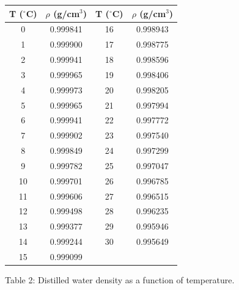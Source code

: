 \documentclass{article}
\begin{document}
\vspace{0.5cm}
\begin{center}
\begin{tabular}{|c|c||c|c|} \hline
T ($^{\circ}$C)  &  $\rho$ (g/cm$^{3}$) & T ($^{\circ}$C) & $\rho$
(g/cm$^{3}$) \\
\hline
0  &  0.999841  &  16  &  0.998943 \\
\hline
1  &  0.999900  &  17  &  0.998775  \\
\hline
2  &  0.999941  &  18  &  0.998596  \\
\hline
3  &  0.999965  &  19  &  0.998406  \\
\hline
4  &  0.999973  &  20  &  0.998205  \\
\hline
5  &  0.999965  &  21  &  0.997994  \\
\hline
6  &  0.999941  &  22  &  0.997772  \\
\hline
7  &  0.999902  &  23  &  0.997540  \\
\hline
8  &  0.999849  &  24  &  0.997299  \\
\hline
9  &  0.999782  &  25  &  0.997047  \\
\hline
10  &  0.999701  &  26  &  0.996785  \\
\hline
11  &  0.999606  &  27  &  0.996515  \\
\hline
12  &  0.999498  &  28  &  0.996235  \\
\hline
13  &  0.999377  &  29  &  0.995946  \\
\hline
14  &  0.999244  &  30  &  0.995649  \\
\hline
15  &  0.999099  &  &  \\
\hline
\end{tabular}

Table 2: Distilled water density as a function of temperature.
\end{center}






\end{document}
